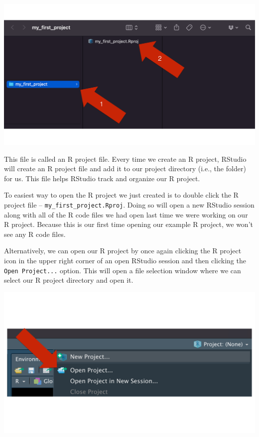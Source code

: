 \documentclass[
  letterpaper,
  DIV=11,
  numbers=noendperiod]{scrreprt}
\begin{document}
\includegraphics{chapters/r_projects/create_06_rproj_file.png}

This file is called an R project file. Every time we create an R
project, RStudio will create an R project file and add it to our project
directory (i.e., the folder) for us. This file helps RStudio track and
organize our R project.

To easiest way to open the R project we just created is to double click
the R project file -- \texttt{my\_first\_project.Rproj}. Doing so will
open a new RStudio session along with all of the R code files we had
open last time we were working on our R project. Because this is our
first time opening our example R project, we won't see any R code files.

Alternatively, we can open our R project by once again clicking the R
project icon in the upper right corner of an open RStudio session and
then clicking the \texttt{Open\ Project...} option. This will open a
file selection window where we can select our R project directory and
open it.

\includegraphics{chapters/r_projects/open_rproj.png}
\end{document}
